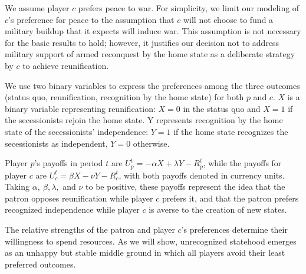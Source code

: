 \documentclass[11pt,letterpaper, notitlepage]{article}
\begin{document}
We assume player $c$ prefers peace to war. For simplicity, we limit our modeling of $c$'s preference for peace to the assumption that $c$ will not choose to fund a military buildup that it expects will induce war. This assumption is not necessary for the basic results to hold; however, it justifies our decision not to address military support of armed reconquest by the home state as a deliberate strategy by $c$ to achieve reunification. 

We use two binary variables to express the preferences among the three outcomes (status quo, reunification, recognition by the home state) for both $p$ and $c$. $X$ is a binary variable representing reunification: $X=0$ in the status quo and $X=1$ if the secessionists rejoin the home state. Y represents recognition by the home state of the secessionists' independence: $Y=1$ if the home state recognizes the secessionists as independent, $Y=0$ otherwise. 

Player $p$'s payoffs in period $t$ are $U_p^t= -\alpha X+\lambda Y -R_p^t$, while the payoffs for player $c$ are $U_c^t= \beta X-\nu Y -R_c^t$, with both payoffs denoted in currency units. Taking $\alpha, \ \beta, \lambda,$ and $\nu$ to be positive, these payoffs represent the idea that the patron opposes reunification while player $c$ prefers it, and that the patron prefers recognized independence while player $c$ is averse to the creation of new states.

The relative strengths of the patron and player $c$'s preferences determine their willingness to spend resources. As we will show, unrecognized statehood emerges as an unhappy but stable middle ground in which all players avoid their least preferred outcomes.

\end{document}
